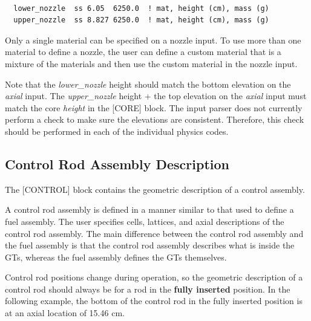 
\begin{Verbatim}[fontsize=\small]

  lower_nozzle  ss 6.05  6250.0  ! mat, height (cm), mass (g)
  upper_nozzle  ss 8.827 6250.0  ! mat, height (cm), mass (g)
\end{Verbatim}

Only a single material can be specified on a nozzle input.  To use
more than one material to define a nozzle, the user can define a custom material that
is a mixture of the materials and then use the custom material in the nozzle input.

Note that the {\it lower\_nozzle} height should match the bottom elevation on the {\it axial} input.
The {\it upper\_nozzle} height + the top elevation on the {\it axial} input must match the
core {\it height} in the [CORE] block.
The input parser does not currently perform a check to make sure the elevations are consistent.
Therefore, this check should be performed in each of the individual physics codes.

\subsection{Control Rod Assembly Description}

The [CONTROL] block contains the geometric description of a control assembly.

A control rod assembly is defined in a manner similar to that used to define a fuel assembly.
The user specifies cells, lattices, and axial descriptions of the control rod assembly.
The main difference between the control rod assembly and the fuel assembly is that
the control rod assembly describes what is inside the GTs, whereas the fuel assembly
defines the GTs themselves.

Control rod positions change during operation, so the geometric description of a control rod
should always be for a rod in the {\bf fully inserted} position.
In the following example, the bottom of the control rod in the fully inserted position is
at an axial location of 15.46 cm.

